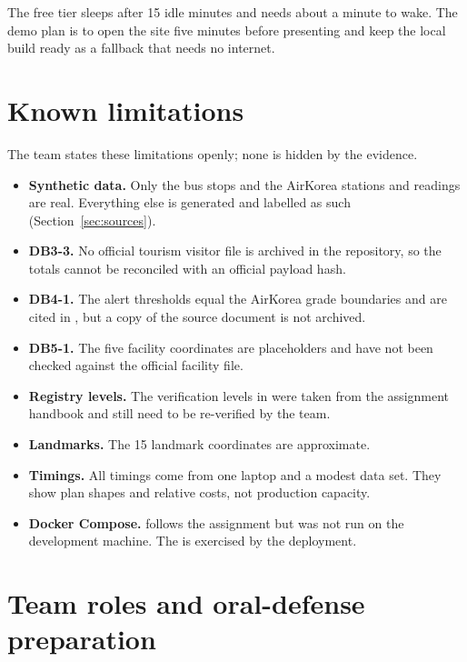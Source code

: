 \documentclass[11pt,a4paper]{article}
\begin{document}
The free tier sleeps after 15 idle minutes and needs about a minute to wake. The demo plan
is to open the site five minutes before presenting and keep the local build ready as a
fallback that needs no internet.

\section{Known limitations}\label{sec:limits}

The team states these limitations openly; none is hidden by the evidence.

\begin{itemize}
  \item \textbf{Synthetic data.} Only the bus stops and the AirKorea stations and readings
    are real. Everything else is generated and labelled as such (Section~\ref{sec:sources}).
  \item \textbf{DB3-3.} No official tourism visitor file is archived in the repository,
    so the totals cannot be reconciled with an official payload hash.
  \item \textbf{DB4-1.} The alert thresholds equal the AirKorea grade boundaries and are
    cited in , but a copy of the source document is not archived.
  \item \textbf{DB5-1.} The five facility coordinates are placeholders and have not been
    checked against the official facility file.
  \item \textbf{Registry levels.} The verification levels in 
    were taken from the assignment handbook and still need to be re-verified by the team.
  \item \textbf{Landmarks.} The 15 landmark coordinates are approximate.
  \item \textbf{Timings.} All timings come from one laptop and a modest data set. They
    show plan shapes and relative costs, not production capacity.
  \item \textbf{Docker Compose.}  follows the assignment but was not
    run on the development machine. The  is exercised by the deployment.
\end{itemize}

\section{Team roles and oral-defense preparation}\label{sec:team}
\end{document}
